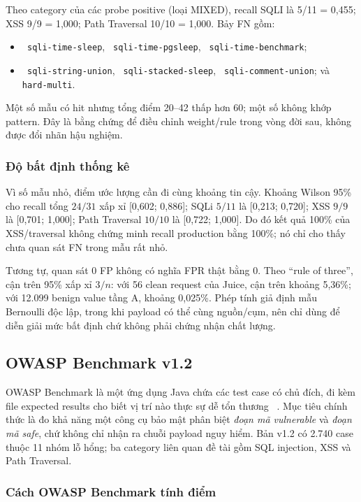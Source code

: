 \documentclass[runningheads]{report-template/llncs}
\newcommand{\code}[1]{\texttt{\small\hyphenchar\font=45 #1}}
\begin{document}
Theo category của các probe positive (loại MIXED), recall SQLI là
5/11 = 0,455; XSS 9/9 = 1,000; Path Traversal 10/10 = 1,000. Bảy FN gồm:
\begin{itemize}
  \item \code{sqli-time-sleep}, \code{sqli-time-pgsleep},
  \code{sqli-time-benchmark};
  \item \code{sqli-string-union}, \code{sqli-stacked-sleep},
  \code{sqli-comment-union}; và \code{hard-multi}.
\end{itemize}
Một số mẫu có hit nhưng tổng điểm 20--42 thấp hơn 60; một số không khớp
pattern. Đây là bằng chứng để điều chỉnh weight/rule trong vòng đời sau,
không được đổi nhãn hậu nghiệm.

\subsubsection{Độ bất định thống kê}

Vì số mẫu nhỏ, điểm ước lượng cần đi cùng khoảng tin cậy. Khoảng Wilson
95\% cho recall tổng \(24/31\) xấp xỉ [0,602; 0,886]; SQLi \(5/11\) là
[0,213; 0,720]; XSS \(9/9\) là [0,701; 1,000]; Path Traversal \(10/10\)
là [0,722; 1,000]. Do đó kết quả 100\% của XSS/traversal không chứng minh
recall production bằng 100\%; nó chỉ cho thấy chưa quan sát FN trong mẫu
rất nhỏ.

Tương tự, quan sát 0 FP không có nghĩa FPR thật bằng 0. Theo ``rule of
three'', cận trên 95\% xấp xỉ \(3/n\): với 56 clean request của Juice,
cận trên khoảng 5,36\%; với 12.099 benign value tầng A, khoảng 0,025\%.
Phép tính giả định mẫu Bernoulli độc lập, trong khi payload có thể cùng
nguồn/cụm, nên chỉ dùng để diễn giải mức bất định chứ không phải chứng
nhận chất lượng.

\subsection{OWASP Benchmark v1.2}

OWASP Benchmark là một ứng dụng Java chứa các test case có chủ đích, đi
kèm file expected results cho biết vị trí nào thực sự dễ tổn thương
~\cite{owaspbenchmark}. Mục tiêu chính thức là đo khả năng một công cụ
bảo mật phân biệt \emph{đoạn mã vulnerable} và \emph{đoạn mã safe}, chứ
không chỉ nhận ra chuỗi payload nguy hiểm. Bản v1.2 có 2.740 case thuộc
11 nhóm lỗ hổng; ba category liên quan đề tài gồm SQL injection, XSS và
Path Traversal.

\subsubsection{Cách OWASP Benchmark tính điểm}
\end{document}
